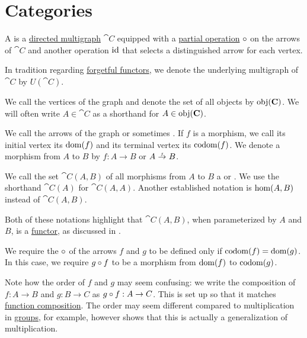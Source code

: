 \section{Categories}\label{sec:categories}

\begin{definition}\label{def:category}\mimprovised
  A  is a \hyperref[def:directed_multigraph]{directed multigraph} \( \cat{C} \) equipped with a \hyperref[def:set_valued_map/partial]{partial operation} \( \bincirc \) on the arrows of \( \cat{C} \) and another operation \( \operatorname{id} \) that selects a distinguished arrow for each vertex.

  In tradition regarding \hyperref[def:concrete_category]{forgetful functors}, we denote the underlying multigraph of \( \cat{C} \) by \( U(\cat{C}) \).

  \begin{thmenum}[series=def:category]
     We call the vertices of the graph  and denote the set of all objects by \( \obj(\cat{C}) \). We will often write \( A \in \cat{C} \) as a shorthand for \( A \in \obj(\cat{C}) \).

     We call the arrows of the graph  or sometimes . If \( f \) is a morphism, we call its initial vertex its  \( \operatorname{dom}(f) \) and its terminal vertex its  \( \operatorname*{co\negthinspace\operatorname{dom}}(f) \). We denote a morphism from \( A \) to \( B \) by \( f: A \to B \) or \( A \reloset f \to B \).

    We call the set \( \cat{C}(A, B) \) of all morphisms from \( A \) to \( B \) a  or . We use the shorthand \( \cat{C}(A) \) for \( \cat{C}(A, A) \). Another established notation is \( \op{hom}(A, B) \) instead of \( \cat{C}(A, B) \).

    Both of these notations highlight that \( \cat{C}(A, B) \), when parameterized by \( A \) and \( B \), is a \hyperref[def:functor]{functor}, as discussed in .

     We require the  \( \bincirc \) of the arrows \( f \) and \( g \) to be defined only if \( \operatorname*{co\negthinspace\operatorname{dom}}(f) = \operatorname{dom}(g) \). In this case, we require \( g \bincirc f \) to be a morphism from \( \operatorname{dom}(f) \) to \( \operatorname*{co\negthinspace\operatorname{dom}}(g) \).

    Note how the order of \( f \) and \( g \) may seem confusing: we write the composition of \( f: A \to B \) and \( g: B \to C \) as \( g \bincirc f: A \to C \). This is set up so that it matches \hyperref[def:set_valued_map/composition]{function composition}. The order may seem different compared to multiplication in \hyperref[def:group]{groups}, for example, however  shows that this is actually a generalization of multiplication.


\end{thmenum}
\end{definition}
